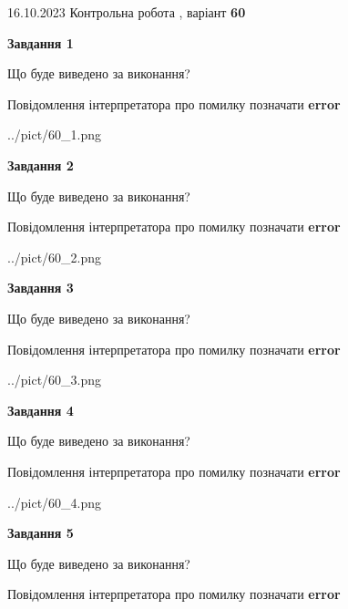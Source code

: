 \documentclass[12pt, ukrainian]{article}
\begin{document}
{\Large{16.10.2023 Контрольна робота , варіант  \No \textbf { 60 }\par}}
{
\begin {large}
{\begin {center}\textbf{Завдання 1}\end {center}}\par
Що буде виведено за виконання? \par
Повідомлення інтерпретатора про помилку позначати \textbf{error}

\begin{center}
	{../pict/60_1.png}
\end{center}
\newpage

{\begin {center}\textbf{Завдання 2}\end {center}}\par
Що буде виведено за виконання? \par
Повідомлення інтерпретатора про помилку позначати \textbf{error}

\begin{center}
	{../pict/60_2.png}
\end{center}
\newpage

{\begin {center}\textbf{Завдання 3}\end {center}}\par
Що буде виведено за виконання? \par
Повідомлення інтерпретатора про помилку позначати \textbf{error}

\begin{center}
	{../pict/60_3.png}
\end{center}
\newpage

{\begin {center}\textbf{Завдання 4}\end {center}}\par
Що буде виведено за виконання? \par
Повідомлення інтерпретатора про помилку позначати \textbf{error}

\begin{center}
	{../pict/60_4.png}
\end{center}
\newpage

{\begin {center}\textbf{Завдання 5}\end {center}}\par
Що буде виведено за виконання? \par
Повідомлення інтерпретатора про помилку позначати \textbf{error}


\end{large}}
\end{document}
